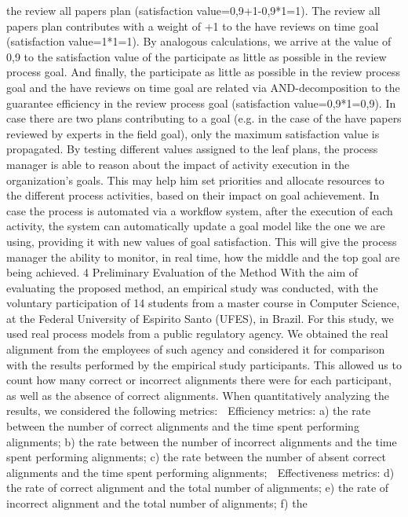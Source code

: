 the review all papers plan (satisfaction value=0,9+1-0,9*1=1). The review all papers
plan contributes with a weight of +1 to the have reviews on time goal (satisfaction
value=1*1=1). By analogous calculations, we arrive at the value of 0,9 to the satisfaction value of the participate as little as possible in the review process goal. And 
finally, the participate as little as possible in the review process goal and the have
reviews on time goal are related via AND-decomposition to the guarantee efficiency
in the review process goal (satisfaction value=0,9*1=0,9). In case there are two plans
contributing to a goal (e.g. in the case of the have papers reviewed by experts in
the field goal), only the maximum satisfaction value is propagated.
By testing different values assigned to the leaf plans, the process manager is able to
reason about the impact of activity execution in the organization’s goals. This may help
him set priorities and allocate resources to the different process activities, based on their
impact on goal achievement. In case the process is automated via a workflow system,
after the execution of each activity, the system can automatically update a goal model
like the one we are using, providing it with new values of goal satisfaction. This will
give the process manager the ability to monitor, in real time, how the middle and the
top goal are being achieved.
4 Preliminary Evaluation of the Method
With the aim of evaluating the proposed method, an empirical study was conducted,
with the voluntary participation of 14 students from a master course in Computer Science, at the Federal University of Espirito Santo (UFES), in Brazil. For this study, we
used real process models from a public regulatory agency. We obtained the real alignment from the employees of such agency and considered it for comparison with the
results performed by the empirical study participants. This allowed us to count how
many correct or incorrect alignments there were for each participant, as well as the
absence of correct alignments.
When quantitatively analyzing the results, we considered the following metrics:
 Efficiency metrics: a) the rate between the number of correct alignments and the
time spent performing alignments; b) the rate between the number of incorrect
alignments and the time spent performing alignments; c) the rate between the number of absent correct alignments and the time spent performing alignments;
 Effectiveness metrics: d) the rate of correct alignment and the total number of alignments; e) the rate of incorrect alignment and the total number of alignments; f) the
